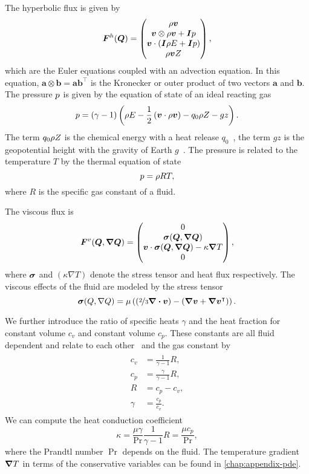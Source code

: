 The hyperbolic flux is given by
\begin{equation}
  \label{eq:hyper-flux}
  \bm{F}^{h}(\bm{Q}) = \begin{pmatrix} \rho \bm{v} \\ \bm{v} \otimes \rho \bm{v} + \bm{I} p \\ \bm{v} \cdot (\bm{I} \rho E + \bm{I} p) \\ \rho \bm{v} Z \end{pmatrix},
\end{equation}
which are the Euler equations coupled with an advection equation.
In this equation, $\bm{a} \otimes \bm{b} = \bm{a} \bm{b}^\intercal$ is the Kronecker or outer product of two vectors $\bm{a}$ and $\bm{b}$.
The pressure $p$ is given by the equation of state of an ideal reacting gas
\begin{equation}
  \label{eq:eos}
  p = (\gamma - 1) \left(\rho E - \frac{1}{2} \left(\bm{v} \cdot \rho \bm{v} \right)  - q_0 \rho Z - gz \right).
\end{equation}
The term $q_0 \rho Z$ is the chemical energy with a heat release $q_0$~\cite{helzel2000modified}, the term $gz$ is the geopotential height with the gravity of Earth $g$~\cite{giraldo2008study}.
The pressure is related to the temperature $T$ by the thermal equation of state
\begin{equation}
  \label{eq:temperature}
  p = \rho R T,
\end{equation}
where $R$ is the specific gas constant of a fluid.

The viscous flux is
\begin{equation}
  \label{eq:visc-flux}
  \viscFlux(\Q, \gradQ) = \viscFluxDef,
\end{equation}
where $\bm{\sigma}$ and $(\kappa \nabla T)$ denote the stress tensor and heat flux respectively.
The viscous effects of the fluid are modeled by the stress tensor
\begin{equation}
  \label{eq:stress-tensor}
  \stressT(Q, \nabla Q) =
  \mu
  \left(
  \left(\nicefrac{2}{3} \divergence{\Qv} \right) -
  \left( \gradient{\Qv} + \gradient{\Qv}^\intercal \right)
  \right).
\end{equation}

We further introduce the ratio of specific heats $\gamma$ and the heat fraction for constant volume $c_v$ and constant volume $c_p$.
These constants are all fluid dependent and relate to each other~\cite{dumbser2010arbitrary} and the gas constant by
\begin{align}
  \label{eq:fluid-constants}
  \begin{split}
  c_v &= \frac{1}{\gamma - 1} R, \\
  c_p &= \frac{\gamma}{\gamma - 1} R,\\
  R &= c_p - c_v,\\
  \gamma &= \frac{c_p}{c_v}.
  \end{split}
\end{align}
We can compute the heat conduction coefficient
\begin{equation}
  \label{eq:heat-conduction-coeff}
  \kappa = \frac{\mu \gamma}{\Pr} \frac{1}{\gamma - 1} R = \frac{\mu c_p}{\Pr},
\end{equation}
where the Prandtl number $\Pr$ depends on the fluid.
The temperature gradient $\gradient{T}$ in terms of the conservative variables can be found in \cref{chap:appendix-pde}.

